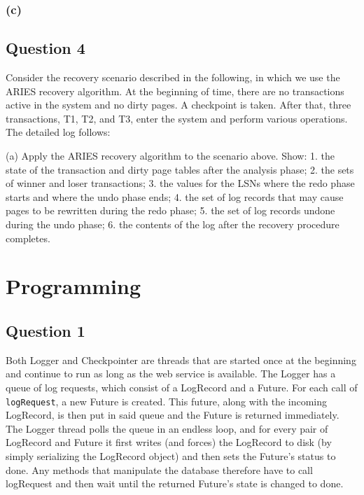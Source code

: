 \documentclass[12pt,a4paper]{article}
\begin{document}
\subsubsection*{(c)}


\subsection*{Question 4}
\label{sec:eq4}

Consider the recovery scenario described in the following, in which we use the
ARIES recovery algorithm. At the beginning of time, there are no transactions active in the system and no
dirty pages. A checkpoint is taken. After that, three transactions, T1, T2, and T3, enter the system and
perform various operations. The detailed log follows:

(a) Apply the ARIES recovery algorithm to the scenario above. Show:
1. the state of the transaction and dirty page tables after the analysis phase;
2. the sets of winner and loser transactions;
3. the values for the LSNs where the redo phase starts and where the undo phase ends;
4. the set of log records that may cause pages to be rewritten during the redo phase;
5. the set of log records undone during the undo phase;
6. the contents of the log after the recovery procedure completes.


\section*{Programming} 
\label{sec:programming}

\subsection*{Question 1}
\label{sec:pq1}

Both Logger and Checkpointer are threads that are started once at the beginning and continue to run as long as the web service is available. The Logger has a queue of log requests, which consist of a LogRecord and a Future. For each call of \texttt{logRequest}, a new Future is created. This future, along with the incoming LogRecord, is then put in said queue and the Future is returned immediately. The Logger thread polls the queue in an endless loop, and for every pair of LogRecord and Future it first writes (and forces) the LogRecord to disk (by simply serializing the LogRecord object) and then sets the Future's status to done. Any methods that manipulate the database therefore have to call logRequest and then wait until the returned Future's state is changed to done.
\end{document}
